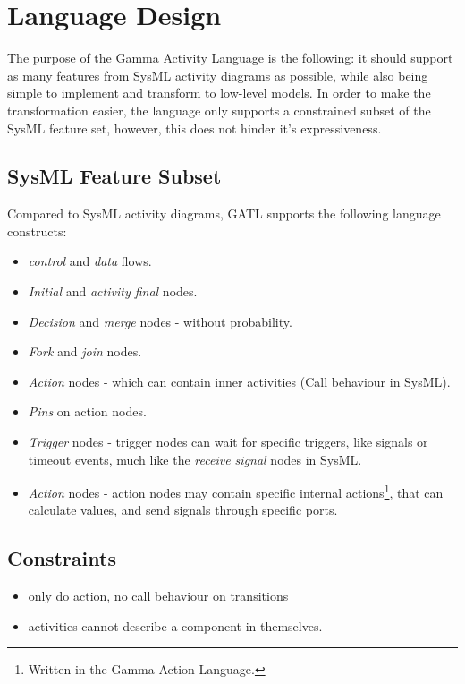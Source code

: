 \section{Language Design}

The purpose of the Gamma Activity Language is the following: it should support as many features from SysML activity diagrams as possible, while also being simple to implement and transform to low-level models. In order to make the transformation easier, the language only supports a constrained subset of the SysML feature set, however, this does not hinder it's expressiveness.

\subsection{SysML Feature Subset}

Compared to SysML activity diagrams, GATL supports the following language constructs:

\begin{itemize}
	\item \emph{control} and \emph{data} flows.
	\item \emph{Initial} and \emph{activity final} nodes.
	\item \emph{Decision} and \emph{merge} nodes - without probability.
	\item \emph{Fork} and \emph{join} nodes.
	\item \emph{Action} nodes - which can contain inner activities (Call behaviour in SysML).
	\item \emph{Pins} on action nodes.
	\item \emph{Trigger} nodes - trigger nodes can wait for specific triggers, like signals or timeout events, much like the \emph{receive signal} nodes in SysML.
	\item \emph{Action} nodes - action nodes may contain specific internal actions\footnote{Written in the Gamma Action Language.}, that can calculate values, and send signals through specific ports.
\end{itemize}

\subsection{Constraints}\label{ssec:activity-constraints}


\begin{itemize}
	\item only do action, no call behaviour on transitions
	\item activities cannot describe a component in themselves.
\end{itemize}
